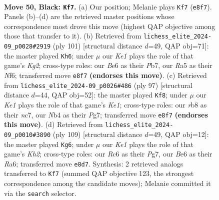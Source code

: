 \documentclass[11pt]{article}
\begin{document}
\clearpage

\begin{figure}[p]\centering
\begin{subfigure}{0.46\textwidth}\centering
\resizebox{\linewidth}{!}{%
\newchessgame
\chessboard[
  setfen={1R2k3/8/2r1bB2/rp6/1n4p1/4P1PP/4RP1K/8 b - - 1 50},
  showmover=false,
  pgfstyle=straightmove, color=movearrow, markmove={e8-f7}
]}
\caption{}
\end{subfigure}\hfill
\begin{subfigure}{0.46\textwidth}\centering
\resizebox{\linewidth}{!}{%
\newchessgame
\chessboard[
  setfen={8/1p2R1k1/5n2/1r1P1B2/4p2P/4b1P1/6K1/3R4 b - - 0 51},
  showmover=false,
  pgfstyle=straightmove, color=movearrow, markmove={g7-h6}
]}
\caption{}
\end{subfigure}
\\[4pt]
\begin{subfigure}{0.46\textwidth}\centering
\resizebox{\linewidth}{!}{%
\newchessgame
\chessboard[
  setfen={4k3/1pN3p1/1p3bPp/8/5P2/P2R2P1/1P1p2K1/3r4 b - - 3 49},
  showmover=false,
  pgfstyle=straightmove, color=movearrow, markmove={e8-f8}
]}
\caption{}
\end{subfigure}\hfill
\begin{subfigure}{0.46\textwidth}\centering
\resizebox{\linewidth}{!}{%
\newchessgame
\chessboard[
  setfen={8/6pk/r7/2K4p/rP6/6P1/pR5P/R7 b - - 7 55},
  showmover=false,
  pgfstyle=straightmove, color=movearrow, markmove={h7-g6}
]}
\caption{}
\end{subfigure}
\caption{\textbf{Move 50, Black: \texttt{Kf7}.} (a) Our position; Melanie plays \texttt{Kf7} (\texttt{e8f7}). Panels (b)--(d) are the retrieved master positions whose correspondence most drove this move (highest QAP objective among those that transfer to it). (b) Retrieved from \texttt{lichess\_elite\_2024-09\_p0028\#2919} (ply 101) [structural distance $d$=49, QAP obj=71]: the master played \texttt{Kh6}; under $\mu$ our \emph{Ke1} plays the role of that game's \emph{Kg2}; cross-type roles: our \emph{B}e6 as their \emph{P}b7, our \emph{R}a5 as their \emph{N}f6; transferred move \texttt{e8f7} \textbf{(endorses this move)}. (c) Retrieved from \texttt{lichess\_elite\_2024-09\_p0026\#486} (ply 97) [structural distance $d$=44, QAP obj=52]: the master played \texttt{Kf8}; under $\mu$ our \emph{Ke1} plays the role of that game's \emph{Ke1}; cross-type roles: our \emph{r}b8 as their \emph{n}c7, our \emph{N}b4 as their \emph{P}g7; transferred move \texttt{e8f7} \textbf{(endorses this move)}. (d) Retrieved from \texttt{lichess\_elite\_2024-09\_p0010\#3890} (ply 109) [structural distance $d$=49, QAP obj=12]: the master played \texttt{Kg6}; under $\mu$ our \emph{Ke1} plays the role of that game's \emph{Kh2}; cross-type roles: our \emph{R}c6 as their \emph{P}g7, our \emph{B}e6 as their \emph{R}a6; transferred move \texttt{e8d7}. Synthesis: 2 retrieved analogs transferred to \texttt{Kf7} (summed QAP objective 123, the strongest correspondence among the candidate moves); Melanie committed it via the \texttt{search} selector.}
\label{fig:thought-m99}
\end{figure}
\end{document}
